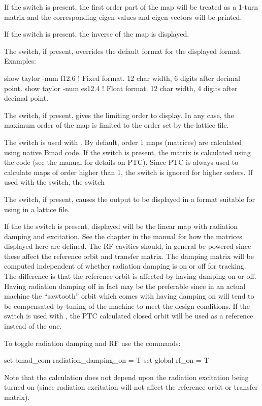 {{{{{{{{{{If the  switch is present, the first order part of the map will be treated as a
1-turn matrix and the corresponding eigen values and eigen vectors will be printed.

If the  switch is present, the inverse of the map is displayed.

The  switch, if present, overrides the default format for the displayed format.
Examples:
\begin{example}
  show taylor -num f12.6  ! Fixed format. 12 char width, 6 digits after decimal point.
  show taylor -num es12.4 ! Float format. 12 char width, 4 digits after decimal point.
\end{example}

The  switch, if present, gives the limiting order to display. In any case, the
maximum order of the map is limited to the order set by the lattice file.

The  switch is used with . By default, order 1 maps (matrices) are calculated
using native Bmad code. If the  switch is present, the matrix is calculated using the
 code (see the \bmad manual for details on PTC). Since PTC is always used to calculate maps
of order higher than 1, the  switch is ignored for higher orders. If used with the
 switch, the  switch 

The  switch, if present, causes the output to be displayed in a format suitable
for using in a \bmad lattice file.

If the the  switch is present, displayed will be the linear map with radiation
damping and excitation. See the  chapter in the \bmad manual for how the
matrices displayed here are defined. The RF cavities should, in general be powered since these
affect the reference orbit and transfer matrix. The damping matrix will be computed independent of
whether radiation damping is on or off for tracking. The difference is that the reference orbit is
affected by having damping on or off. Having radiation damping off in fact may be the preferable
since in an actual machine the ``sawtooth'' orbit which comes with having damping on will tend to be
compensated by tuning of the machine to meet the design conditions. If the  switch is used
with , the PTC calculated closed orbit will be used as a reference instead of the
\bmad one.

To toggle radiation damping and RF use the commands:
\begin{example}
  set bmad_com radiation_damping_on = T
  set global rf_on = T
\end{example}
Note that the calculation does not depend upon the radiation excitation being turned on (since
radiation excitation will not affect the reference orbit or transfer matrix).

}}}}}}}}}}
